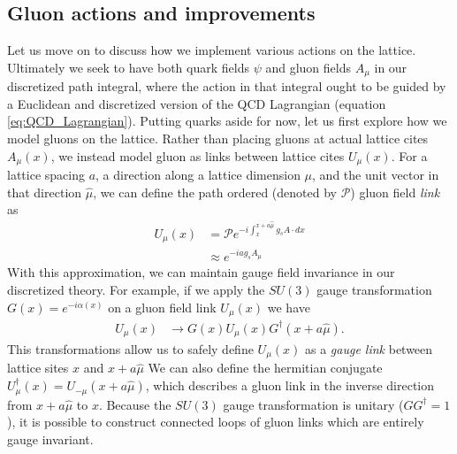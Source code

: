 \subsection{Gluon actions and improvements}\label{sec:lattice_actions_and_improvements}
Let us move on to discuss how we implement various actions on the lattice.  Ultimately we seek to have both quark fields $\psi$ and gluon fields $A_\mu$ in our discretized path integral, where the action in that integral ought to be guided by a Euclidean and discretized version of the QCD Lagrangian (equation \ref{eq:QCD_Lagrangian}).  Putting quarks aside for now, let us first explore how we model gluons on the lattice.  Rather than placing gluons at actual lattice cites $A_\mu(x)$, we instead model gluon as links between lattice cites $U_\mu(x)$.  For a lattice spacing $a$, a direction along a lattice dimension $\mu$, and the unit vector in that direction $\hat{\mu}$, we can define the path ordered (denoted by $\mathcal{P}$) gluon field \textit{link} as
\begin{equation}\label{eq:gluon_link}
\begin{split}
    U_\mu(x) &= \mathcal{P}e^{-i\int_x^{x+a\hat\mu} g_s A\cdot dx} \\
    &\approx e^{-iag_sA_\mu}
\end{split}
\end{equation}
With this approximation, we can maintain gauge field invariance in our discretized theory.  For example, if we apply the $SU(3)$ gauge transformation $G(x)=e^{-i\alpha(x)}$ on a gluon field link $U_\mu(x)$ we have
\begin{equation}\label{eq:SU3_gauge_transformation}
    \begin{split}
        U_\mu(x) &\rightarrow G(x)U_\mu (x) G^\dagger(x+a\hat{\mu}).
    \end{split}
\end{equation}
This transformations allow us to safely define $U_\mu(x)$ as a \textit{gauge link} between lattice sites $x$ and $x+a\hat\mu$  We can also define the hermitian conjugate $U^\dagger_\mu(x) = U_{-\mu}(x + a\hat\mu)$, which describes a gluon link in the inverse direction from $x+a\hat\mu$ to $x$.  Because the $SU(3)$ gauge transformation is unitary ($GG^\dagger=1$), it is possible to construct connected loops of gluon links which are entirely gauge invariant.

